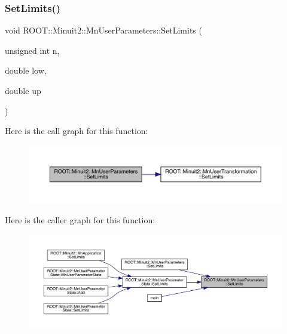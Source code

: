 \mbox{\label{classROOT_1_1Minuit2_1_1MnUserParameters_afa56296f97716c90cfbdd3f81d5caffc}} 
\subsubsection{\texorpdfstring{SetLimits()}{SetLimits()}\hspace{0.1cm}{\footnotesize\ttfamily [2/4]}}
{\footnotesize\ttfamily void R\+O\+O\+T\+::\+Minuit2\+::\+Mn\+User\+Parameters\+::\+Set\+Limits (\begin{DoxyParamCaption}\item[{unsigned int}]{n,  }\item[{double}]{low,  }\item[{double}]{up }\end{DoxyParamCaption})}

Here is the call graph for this function\+:\nopagebreak
\begin{figure}[H]
\begin{center}
\leavevmode
\includegraphics[width=350pt]{d6/d10/classROOT_1_1Minuit2_1_1MnUserParameters_afa56296f97716c90cfbdd3f81d5caffc_cgraph}
\end{center}
\end{figure}
Here is the caller graph for this function\+:\nopagebreak
\begin{figure}[H]
\begin{center}
\leavevmode
\includegraphics[width=350pt]{d6/d10/classROOT_1_1Minuit2_1_1MnUserParameters_afa56296f97716c90cfbdd3f81d5caffc_icgraph}
\end{center}
\end{figure}
\mbox{\label{classROOT_1_1Minuit2_1_1MnUserParameters_a3b22d430f97df8789a8890497c57eed4}} 
